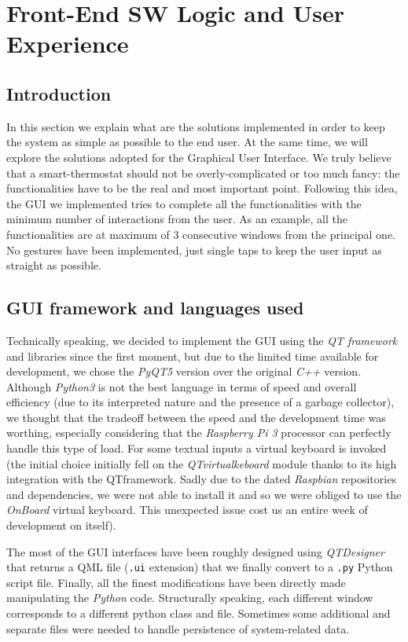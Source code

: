 \documentclass[a4paper]{article}
\begin{document}
    \section{Front-End SW Logic and User Experience}
        \subsection{Introduction}
        In this section we explain what are the solutions implemented in order to keep the system as simple as possible to the end user. At the same time, we will explore the solutions adopted for the Graphical User Interface. We truly believe that a smart-thermostat should not be overly-complicated or too much fancy: the functionalities have to be the real and most important point.
        Following this idea, the GUI we implemented tries to complete all the functionalities with the minimum number of interactions from the user. As an example, all the functionalities are at maximum of 3 consecutive windows from the principal one. No gestures have been implemented, just single taps to keep the user input as straight as possible. 

        \subsection{GUI framework and languages used}
        Technically speaking, we decided to implement the GUI using the \emph{QT framework} and libraries since the first moment, but due to the limited time available for development, we chose the \emph{PyQT5} version over the original \emph{C++} version. Although \emph{Python3} is not the best language in terms of speed and overall efficiency (due to its interpreted nature and the presence of a garbage collector), we thought that the tradeoff between the speed and the development time was worthing, especially considering that the \emph{Raspberry Pi 3} processor can perfectly handle this type of load. For some textual inputs a virtual keyboard is invoked (the initial choice initially fell on the \emph{QTvirtualkeboard} module thanks to its high integration with the QTframework. Sadly due to the dated \emph{Raspbian} repositories and dependencies, we were not able to install it and so we were obliged to use the \emph{OnBoard} virtual keyboard. This unexpected issue cost us an entire week of development on itself).

        The most of the GUI interfaces have been roughly designed using \emph{QTDesigner} that returns a QML file (\texttt{.ui} extension) that we finally convert to a \texttt{.py} Python script file. Finally, all the finest modifications have been directly made manipulating the \emph{Python} code.
        Structurally speaking, each different window corresponds to a different python class and file. Sometimes some additional and separate files were needed to handle persistence of system-related data.
\end{document}
